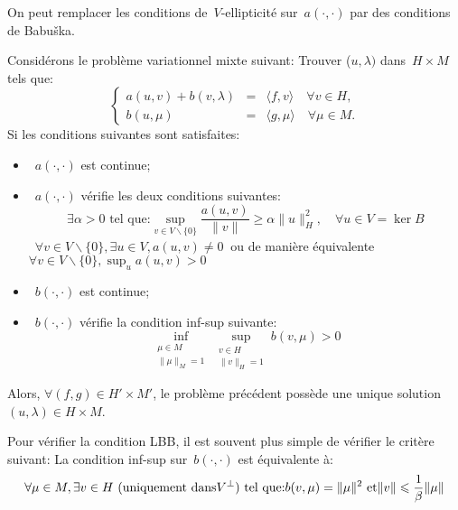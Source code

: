 \medskip



On peut remplacer les conditions de~$V$-ellipticité sur~$a(\cdot,\cdot)$ par des conditions
de Babuška.

\medskip
\begin{theoreme}
Considérons le problème variationnel mixte suivant:
Trouver ($u, \lambda)$ dans~$H\times M$ tels que:
 \begin{equation}\left\{
\begin{array}{rcl}
 a(u,v) + b(v, \lambda) &=& \langle f,v\rangle \quad \forall v\in H,\\
b(u,\mu) &=& \langle g,\mu\rangle \quad \forall \mu \in M.
\end{array}\right.
\end{equation}
Si les conditions suivantes sont satisfaites:
\begin{itemize}
  \item~$a(\cdot,\cdot)$ est continue;
  \item~$a(\cdot,\cdot)$ vérifie les deux conditions suivantes:
  \begin{equation}\exists \alpha> 0 \text{ tel que:} \sup_{v\in V\backslash\{0\}} \frac{a(u,v)}{\|v\|} \ge\alpha\|u\|_H^2, \quad \forall u\in V=\ker B\end{equation}
 ~$\forall v\in V\backslash\{0\}, \exists u\in V, a(u,v)\ne 0~$ ou de manière équivalente
~$\displaystyle\forall v\in V\backslash\{0\}, \sup_u a(u,v)> 0~$
  \item~$b(\cdot,\cdot)$ est continue;
  \item~$b(\cdot,\cdot)$ vérifie la condition inf-sup suivante:
\begin{equation}\inf_{\substack{\mu\in M\\\|\mu\|_M=1}} \sup_{\substack{v\in H\\\|v\|_H=1}} b(v,\mu) > 0\end{equation}
\end{itemize}
Alors, $\forall (f,g)\in H'\times M'$, le problème précédent possède une unique solution
$(u,\lambda) \in H\times M$.
\end{theoreme}
Pour vérifier la condition LBB, il est souvent plus simple de vérifier le critère suivant:
La condition inf-sup sur~$b(\cdot,\cdot)$ est équivalente à:
\begin{equation}\colorred
\forall\mu\in M, \exists v\in H \text{ (uniquement dans}V^\bot\text{) tel que:}
b(v,\mu)=\|\mu\|^2 \text{ et} \|v\|\le \dfrac1\beta \|\mu\|
\end{equation}









